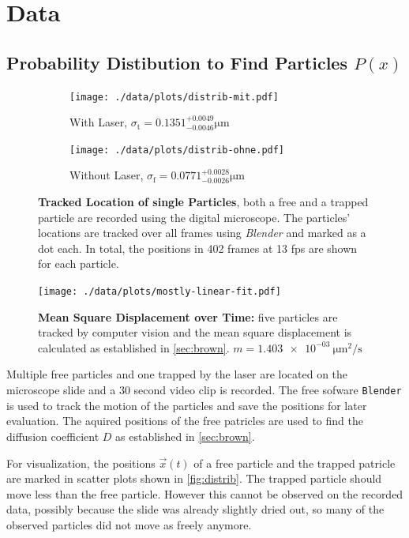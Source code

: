 \chapter{Data}

\section{Probability Distibution to Find Particles $P(x)$}

\begin{figure}
  \centering
  \begin{subfigure}{.45\textwidth}
    \centering
    \texttt{[image: ./data/plots/distrib-mit.pdf]}
    \caption{With Laser, $\sigma_\text{t} = \num{0.1351}^{+0.0049}_{-0.0046}\si{\um}$}
  \end{subfigure}
  \begin{subfigure}{.45\textwidth}
    \centering
    \texttt{[image: ./data/plots/distrib-ohne.pdf]}
    \caption{Without Laser, $\sigma_\text{f} = \num{0.0771}^{+0.0028}_{-0.0026}\si{\um}$}
  \end{subfigure}
  \caption[Tracked Location of single Particles]{\textbf{Tracked Location of single Particles}, both a free and a trapped particle are recorded using the digital microscope. The particles' locations are tracked over all frames using \textit{Blender} and marked as a dot each. In total, the positions in 402 frames at 13 fps are shown for each particle.}
	\label{fig:distrib}
\end{figure}

\begin{figure}
  \centering
  \texttt{[image: ./data/plots/mostly-linear-fit.pdf]}
  \caption[Mean Square Displacement over Time]{\textbf{Mean Square Displacement over Time:} five particles are tracked by computer vision and the mean square displacement is calculated as established in \autoref{sec:brown}. $m = \SI{1.403e-03}{\um\squared\per\second}$}
\end{figure}

Multiple free particles and one trapped by the laser are located on the microscope slide and a \num{30} second video clip is recorded.
The free sofware \texttt{Blender} is used to track the motion of the particles and save the positions for later evaluation.
The aquired positions of the free patricles are used to find the diffusion coefficient $D$ as established in \autoref{sec:brown}.

For visualization, the positions $\vec{x}(t)$ of a free particle and the trapped patricle are marked in scatter plots shown in \autoref{fig:distrib}.
The trapped particle should move less than the free particle.
However this cannot be observed on the recorded data, possibly because the slide was already slightly dried out, so many of the observed particles did not move as freely anymore.

